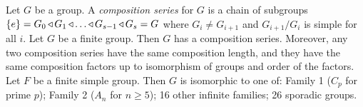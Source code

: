  Let $G$ be a group. A \emph{composition series} for $G$ is a chain of subgroups $\{e\} = G_0 \operatorname{\triangleleft} G_1 \operatorname{\triangleleft} \ldots \operatorname{\triangleleft} G_{s-1} \operatorname{\triangleleft} G_s = G$ where $G_i \ne G_{i+1}$ and $G_{i+1}/G_i$ is simple for all $i$.
 Let $G$ be a finite group. Then $G$ has a composition series. Moreover, any two composition series have the same composition length, and they have the same composition factors up to isomorphism of groups and order of the factors. 
 Let $F$ be a finite simple group. Then $G$ is isomorphic to one of: Family 1 ($C_p$ for prime $p$); Family 2 ($A_n$ for $n \ge 5$); 16 other infinite families; 26 sporadic groups.